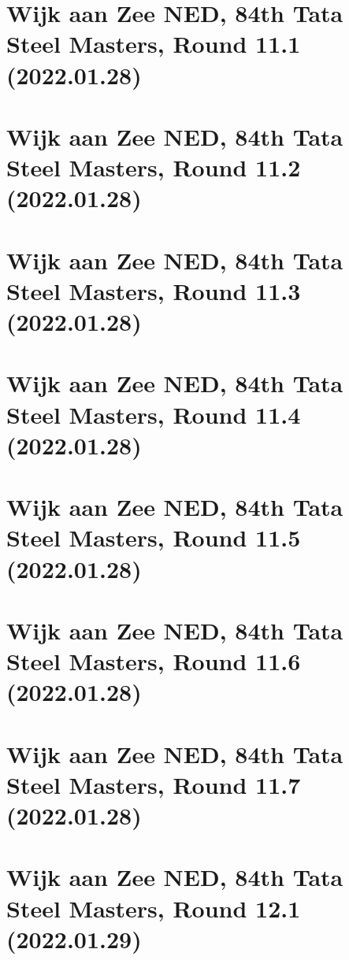 \documentclass[11pt]{article}
\newcommand*\cleartoleftpage{%
   \clearpage
   \ifodd\value{page}\hbox{}\newpage\fi
}
\begin{document}
\cleartoleftpage

\section{Wijk aan Zee NED, 84th Tata Steel Masters, Round 11.1 (2022.01.28)}


\cleartoleftpage

\section{Wijk aan Zee NED, 84th Tata Steel Masters, Round 11.2 (2022.01.28)}


\cleartoleftpage

\section{Wijk aan Zee NED, 84th Tata Steel Masters, Round 11.3 (2022.01.28)}


\cleartoleftpage

\section{Wijk aan Zee NED, 84th Tata Steel Masters, Round 11.4 (2022.01.28)}


\cleartoleftpage

\section{Wijk aan Zee NED, 84th Tata Steel Masters, Round 11.5 (2022.01.28)}


\cleartoleftpage

\section{Wijk aan Zee NED, 84th Tata Steel Masters, Round 11.6 (2022.01.28)}


\cleartoleftpage

\section{Wijk aan Zee NED, 84th Tata Steel Masters, Round 11.7 (2022.01.28)}


\cleartoleftpage

\section{Wijk aan Zee NED, 84th Tata Steel Masters, Round 12.1 (2022.01.29)}

\end{document}
